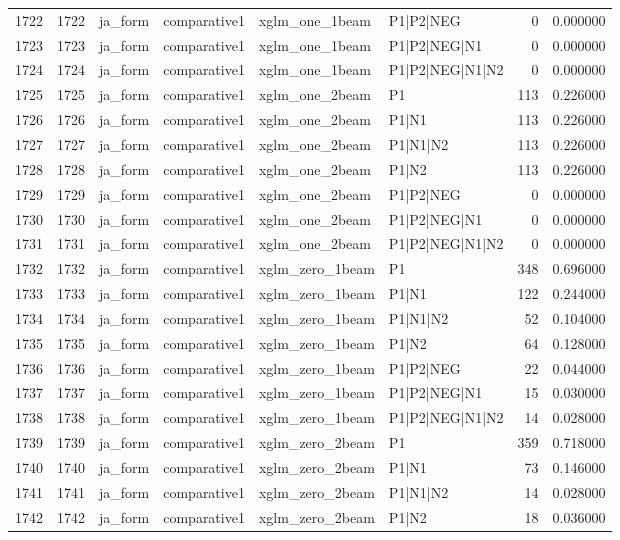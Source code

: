 \begin{tabular}{lrllllrr}
1722 & 1722 & ja_form & comparative1 & xglm_one_1beam & P1|P2|NEG & 0 & 0.000000 \\
1723 & 1723 & ja_form & comparative1 & xglm_one_1beam & P1|P2|NEG|N1 & 0 & 0.000000 \\
1724 & 1724 & ja_form & comparative1 & xglm_one_1beam & P1|P2|NEG|N1|N2 & 0 & 0.000000 \\
1725 & 1725 & ja_form & comparative1 & xglm_one_2beam & P1 & 113 & 0.226000 \\
1726 & 1726 & ja_form & comparative1 & xglm_one_2beam & P1|N1 & 113 & 0.226000 \\
1727 & 1727 & ja_form & comparative1 & xglm_one_2beam & P1|N1|N2 & 113 & 0.226000 \\
1728 & 1728 & ja_form & comparative1 & xglm_one_2beam & P1|N2 & 113 & 0.226000 \\
1729 & 1729 & ja_form & comparative1 & xglm_one_2beam & P1|P2|NEG & 0 & 0.000000 \\
1730 & 1730 & ja_form & comparative1 & xglm_one_2beam & P1|P2|NEG|N1 & 0 & 0.000000 \\
1731 & 1731 & ja_form & comparative1 & xglm_one_2beam & P1|P2|NEG|N1|N2 & 0 & 0.000000 \\
1732 & 1732 & ja_form & comparative1 & xglm_zero_1beam & P1 & 348 & 0.696000 \\
1733 & 1733 & ja_form & comparative1 & xglm_zero_1beam & P1|N1 & 122 & 0.244000 \\
1734 & 1734 & ja_form & comparative1 & xglm_zero_1beam & P1|N1|N2 & 52 & 0.104000 \\
1735 & 1735 & ja_form & comparative1 & xglm_zero_1beam & P1|N2 & 64 & 0.128000 \\
1736 & 1736 & ja_form & comparative1 & xglm_zero_1beam & P1|P2|NEG & 22 & 0.044000 \\
1737 & 1737 & ja_form & comparative1 & xglm_zero_1beam & P1|P2|NEG|N1 & 15 & 0.030000 \\
1738 & 1738 & ja_form & comparative1 & xglm_zero_1beam & P1|P2|NEG|N1|N2 & 14 & 0.028000 \\
1739 & 1739 & ja_form & comparative1 & xglm_zero_2beam & P1 & 359 & 0.718000 \\
1740 & 1740 & ja_form & comparative1 & xglm_zero_2beam & P1|N1 & 73 & 0.146000 \\
1741 & 1741 & ja_form & comparative1 & xglm_zero_2beam & P1|N1|N2 & 14 & 0.028000 \\
1742 & 1742 & ja_form & comparative1 & xglm_zero_2beam & P1|N2 & 18 & 0.036000 \\

\end{tabular}
